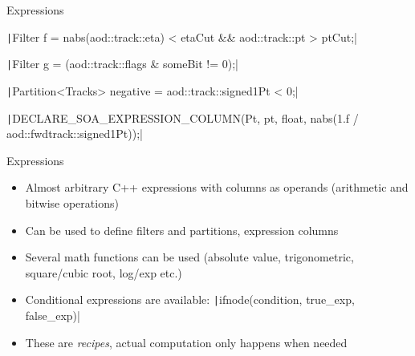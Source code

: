 \documentclass[10pt,lualatex,xcolor={table,svgnames},{hyperref={bookmarks=true,linktoc=all}},aspectratio=169]{beamer}
\newcommand{\programmatic}[1]{\textcolor{-green!40!yellow}{#1}}
\newcommand{\codeline}[1]{{\texttt|#1|}}
\begin{document}
\begin{frame}{Expressions}
    \begin{block}{}
        {\footnotesize\codeline{Filter f = nabs(aod::track::eta) < etaCut && aod::track::pt > ptCut;}}

        {\footnotesize\codeline{Filter g = (aod::track::flags & someBit != 0);}}

        {\footnotesize\codeline{Partition<Tracks> negative = aod::track::signed1Pt < 0;}}

        {\footnotesize\codeline{DECLARE_SOA_EXPRESSION_COLUMN(Pt, pt, float, nabs(1.f / aod::fwdtrack::signed1Pt));}}
    \end{block}
    \begin{block}{Expressions}
        \begin{itemize}
            \item Almost arbitrary C++ expressions with columns as operands (arithmetic and bitwise operations)
            \item Can be used to define \programmatic{filters} and \programmatic{partitions}, \programmatic{expression columns}
            \item Several math functions can be used (absolute value, trigonometric, square/cubic root, log/exp etc.)
            \item Conditional expressions are available: {\footnotesize\codeline{ifnode(condition, true_exp, false_exp)}}
            \item These are \emph{recipes}, actual computation only happens when needed
        \end{itemize}
    \end{block}
\end{frame}
\end{document}
